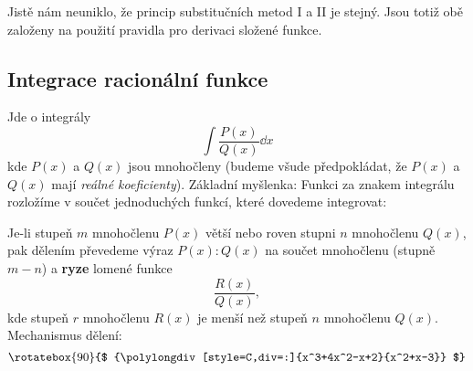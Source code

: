       

      Jistě nám neuniklo, že princip substitučních metod I a II je stejný. Jsou totiž obě založeny 
      na použití pravidla pro derivaci složené funkce.
       
    \newpage
    \subsection{Integrace racionální funkce}
      Jde o integrály 
      \begin{equation}\label{mai:eq157}
        \int\dfrac{P(x)}{Q(x)}\dd{x}
      \end{equation}
      kde \(P(x)\) a \(Q(x)\) jsou mnohočleny (budeme všude předpokládat, že \(P(x)\) a \(Q(x)\)
      mají \emph{reálné koeficienty}). Základní myšlenka: Funkci za znakem integrálu rozložíme v
      součet jednoduchých funkcí, které dovedeme integrovat:
      
      Je-li stupeň \(m\) mnohočlenu \(P(x)\) větší nebo roven stupni \(n\) mnohočlenu \(Q(x)\), pak
      dělením převedeme výraz \(P(x):Q(x)\) na součet mnohočlenu (stupně \(m-n\)) a \textbf{ryze}
      lomené funkce
      \begin{equation}\label{mai:eq158}
        \dfrac{R(x)}{Q(x)},
      \end{equation}
      kde stupeň \(r\) mnohočlenu \(R(x)\) je menší než stupeň \(n\) mnohočlenu \(Q(x)\).
      Mechanismus dělení:
      \begin{equation*}
        \rotatebox{90}{$
          {\polylongdiv[style=C,div=:]{x^3+4x^2-x+2}{x^2+x-3}}
        $}
      \end{equation*}

